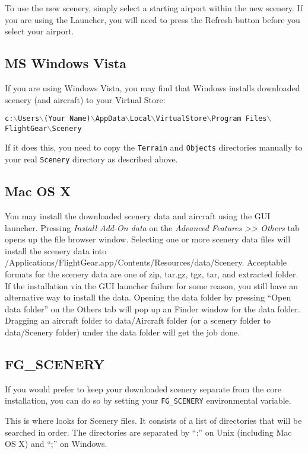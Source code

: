 To use the new scenery, simply select a starting airport within the new scenery.
If you are using the \FlightGear{} Launcher, you will need to press the Refresh
button before you select your airport.

\subsection{MS Windows Vista}
If you are using Windows Vista, you may find that Windows installs downloaded scenery
(and aircraft) to your Virtual Store:

\noindent
{ \footnotesize{\texttt{c:$\backslash$Users$\backslash$(Your
Name)$\backslash$AppData$\backslash$Local$\backslash$VirtualStore$\backslash$Program
Files$\backslash$FlightGear$\backslash$Scenery}}}

If it does this, you need to copy the \texttt{Terrain} and \texttt{Objects}
directories manually to your real \FlightGear{} \texttt{Scenery} directory
as described above.

\subsection{Mac OS X \label{sceneryOnMac}}
You may install the downloaded scenery data and aircraft using the GUI launcher. Pressing \textit{Install Add-On data} on the \textit{Advanced Features >> Others} tab opens up the file browser window. Selecting one or more scenery data files will install the scenery data into /Applications/FlightGear.app/Contents/Resources/data/Scenery. Acceptable formats for the scenery data are one of zip, tar.gz, tgz, tar, and extracted folder. If the installation via the GUI launcher failure for some reason, you still have an alternative way to install the data. Opening the data folder by pressing ``Open data folder'' on the Others tab will pop up an Finder window for the data folder. Dragging an aircraft folder to data/Aircraft folder (or a scenery folder to data/Scenery folder) under the data folder will get the job done.

\subsection{FG\_SCENERY}

If you would prefer to keep your downloaded scenery separate from the core
installation, you can do so by setting your \texttt{FG\_SCENERY} environmental
variable.

This is where \FlightGear{} looks for Scenery files. It consists of a list
of directories that will be searched in order. The directories are separated
by ``:'' on Unix (including Mac OS X) and ``;'' on Windows.

